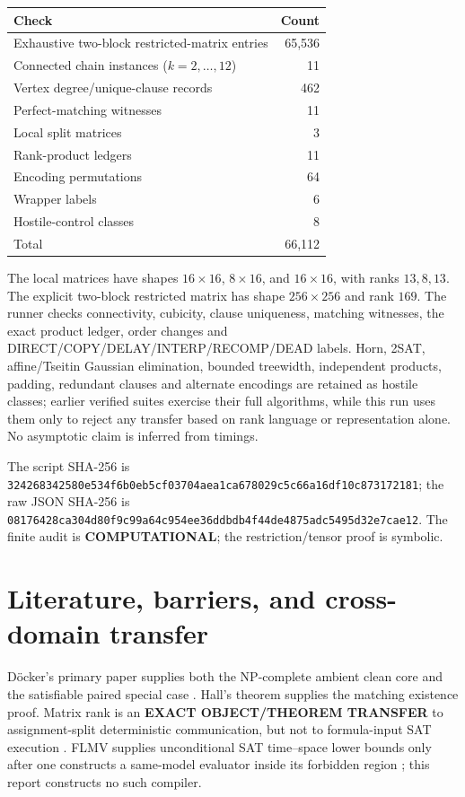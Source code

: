 \documentclass[11pt]{article}
\newcommand{\COMP}{\textbf{COMPUTATIONAL}}
\begin{document}
\begin{center}
\begin{tabular}{lr}
\toprule
Check & Count\\
\midrule
Exhaustive two-block restricted-matrix entries & 65,536\\
Connected chain instances ($k=2,\ldots,12$) & 11\\
Vertex degree/unique-clause records & 462\\
Perfect-matching witnesses & 11\\
Local split matrices & 3\\
Rank-product ledgers & 11\\
Encoding permutations & 64\\
Wrapper labels & 6\\
Hostile-control classes & 8\\
\midrule
Total & 66,112\\
\bottomrule
\end{tabular}
\end{center}

The local matrices have shapes $16\times16$, $8\times16$, and
$16\times16$, with ranks $13,8,13$.  The explicit two-block restricted
matrix has shape $256\times256$ and rank $169$.  The runner checks
connectivity, cubicity, clause uniqueness, matching witnesses, the exact
product ledger, order changes and DIRECT/COPY/DELAY/INTERP/RECOMP/DEAD
labels.  Horn, 2SAT, affine/Tseitin Gaussian elimination, bounded treewidth,
independent products, padding, redundant clauses and alternate encodings are
retained as hostile classes; earlier verified suites exercise their full
algorithms, while this run uses them only to reject any transfer based on
rank language or representation alone.  No asymptotic claim is inferred
from timings.

The script SHA-256 is
\nolinkurl{324268342580e534f6b0eb5cf03704aea1ca678029c5c66a16df10c873172181};
the raw JSON SHA-256 is
\nolinkurl{08176428ca304d80f9c99a64c954ee36ddbdb4f44de4875adc5495d32e7cae12}.
The finite audit is \COMP; the restriction/tensor proof is symbolic.

\section{Literature, barriers, and cross-domain transfer}

D\"ocker's primary paper supplies both the NP-complete ambient clean core
and the satisfiable paired special case \cite{doecker}.  Hall's theorem
supplies the matching existence proof.  Matrix rank is an
\textbf{EXACT OBJECT/THEOREM TRANSFER} to assignment-split deterministic
communication, but not to formula-input SAT execution \cite{mehlhorn}.
FLMV supplies unconditional SAT time--space lower bounds only after one
constructs a same-model evaluator inside its forbidden region
\cite{flmv}; this report constructs no such compiler.
\end{document}

